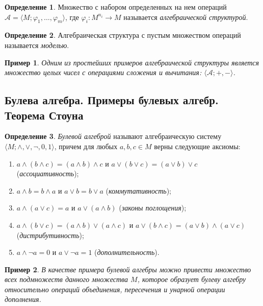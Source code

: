 \documentclass{article}
\theoremstyle{plain}
\newtheorem*{example*}{Пример}
\theoremstyle{definition}
\newtheorem{definition}{Определение}[subsection]
\begin{document}
\begin{definition}
	Множество с набором определенных на нем операций \(\mathcal{A} = \langle M; \varphi_1, \ldots, \varphi_m \rangle\), где \(\varphi_i \colon M^{n_i} \rightarrow M\) называется \textit{алгебраической структурой}.
\end{definition}

\begin{definition}
	Алгебраическая структура с пустым множеством операций называется \textit{моделью}.
\end{definition}

\begin{example*}
	Одним из простейших примеров алгебраической структуры является множество целых чисел с операциями сложения и вычитания: \(\langle \mathcal{A}; +, -\rangle\).
\end{example*}

\subsection{Булева алгебра. Примеры булевых алгебр. Теорема Стоуна}

\begin{definition}
	\textit{Булевой алгеброй} называют алгебраическую систему \(\langle M; \land, \lor, \lnot, 0, 1\rangle\), причем для любых \(a, b, c \in M\) верны следующие аксиомы:

	\begin{enumerate}[label=\roman*.]
		\item \(a \land (b \land c) = (a \land b) \land c\) и \(a \lor (b \lor c) = (a \lor b) \lor c\) (\textit{ассоциативность});
		\item \(a \land b = b \land a\) и \(a \lor b = b \lor a\) (\textit{коммутативность});
		\item \(a \land (a \lor c) = a\) и \(a \lor (a \land b)\) (\textit{законы поглощения});
		\item \(a \land (b \lor c) = (a \land b) \lor (a \land c)\) и \(a \lor (b \land c) = (a \lor b) \land (a \lor c)\) (\textit{дистрибутивность});
		\item \(a \land \lnot a = 0\) и \(a \lor \lnot a = 1\) (\textit{дополнительность}).
	\end{enumerate}
\end{definition}

\begin{example*}
	В качестве примера булевой алгебры можно привести множество всех подмножеств данного множества \(M\), которое образует булеву алгебру относительно операций объединения, пересечения и унарной операции дополнения.
\end{example*}
\end{document}
